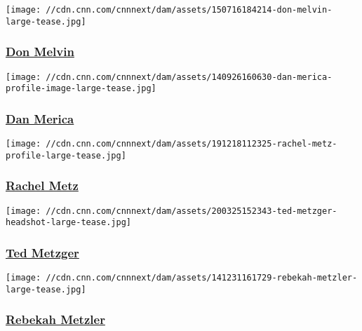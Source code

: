 \href{/profiles/don-melvin}{}

\texttt{[image: //cdn.cnn.com/cnnnext/dam/assets/150716184214-don-melvin-large-tease.jpg]}

\hypertarget{don-melvin}{%
\subsubsection{\texorpdfstring{\href{/profiles/don-melvin}{Don
Melvin}}{Don Melvin}}\label{don-melvin}}

\href{/profiles/dan-merica-profile}{}

\texttt{[image: //cdn.cnn.com/cnnnext/dam/assets/140926160630-dan-merica-profile-image-large-tease.jpg]}

\hypertarget{dan-merica}{%
\subsubsection{\texorpdfstring{\href{/profiles/dan-merica-profile}{Dan
Merica}}{Dan Merica}}\label{dan-merica}}

\href{/profiles/rachel-metz}{}

\texttt{[image: //cdn.cnn.com/cnnnext/dam/assets/191218112325-rachel-metz-profile-large-tease.jpg]}

\hypertarget{rachel-metz}{%
\subsubsection{\texorpdfstring{\href{/profiles/rachel-metz}{Rachel
Metz}}{Rachel Metz}}\label{rachel-metz}}

\href{/profiles/ted-metzger-profile}{}

\texttt{[image: //cdn.cnn.com/cnnnext/dam/assets/200325152343-ted-metzger-headshot-large-tease.jpg]}

\hypertarget{ted-metzger}{%
\subsubsection{\texorpdfstring{\href{/profiles/ted-metzger-profile}{Ted
Metzger}}{Ted Metzger}}\label{ted-metzger}}

\href{/profiles/rebekah-metzler}{}

\texttt{[image: //cdn.cnn.com/cnnnext/dam/assets/141231161729-rebekah-metzler-large-tease.jpg]}

\hypertarget{rebekah-metzler}{%
\subsubsection{\texorpdfstring{\href{/profiles/rebekah-metzler}{Rebekah
Metzler}}{Rebekah Metzler}}\label{rebekah-metzler}}

